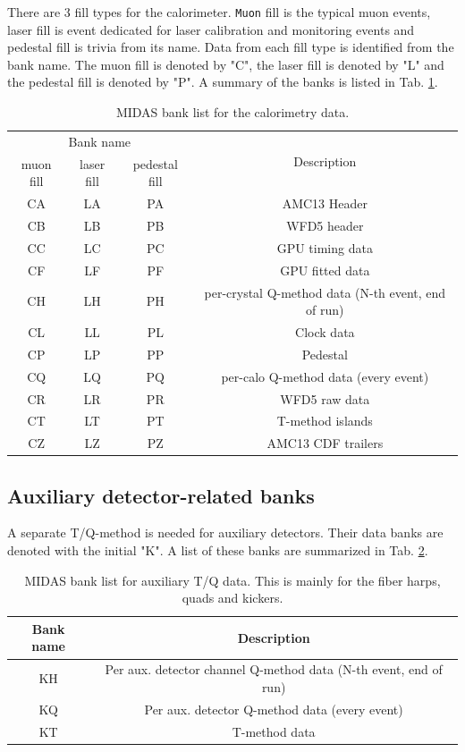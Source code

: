 {There are 3 fill types for the calorimeter. \verb+Muon+ fill is the typical muon events, laser fill is event dedicated for laser calibration and monitoring events and pedestal fill is trivia from its name. Data from each fill type is identified from the bank name. The muon fill is denoted by "C", the laser fill is denoted by "L" and the pedestal fill is denoted by "P". A summary of the banks is listed in Tab. \ref{tab:calotable}.

\begin{table}[htbp]
\centering
\caption{MIDAS bank list for the calorimetry data.}
\begin{tabular}{|c|c|c|c|}
\hline 
\multicolumn{3}{|c|}{Bank name}  & \multirow{2}{*}{Description} \\ \cline{1-3}
muon fill& laser fill & pedestal fill & \\
\hline
CA & LA & PA & AMC13 Header \\ 
\hline 
CB & LB & PB & WFD5 header \\ 
\hline 
CC & LC & PC & GPU timing data \\ 
\hline 
CF & LF & PF & GPU fitted data \\ 
\hline 
CH & LH & PH & per-crystal Q-method data (N-th event, end of run) \\ 
\hline 
CL & LL & PL & Clock data \\ 
\hline 
CP & LP & PP & Pedestal\\ 
\hline 
CQ & LQ & PQ & per-calo Q-method data (every event) \\ 
\hline 
CR & LR & PR & WFD5 raw data \\ 
\hline 
CT & LT & PT & T-method islands \\ 
\hline 
CZ & LZ & PZ & AMC13 CDF trailers \\ 
\hline 
\end{tabular} 
\label{tab:calotable}
\end{table}

\subsection{Auxiliary detector-related banks}

A separate T/Q-method is needed for auxiliary detectors. Their data banks are denoted with the initial "K".
A list of these banks are summarized in Tab. \ref{tab:auxtable}.

\begin{table}[htbp]
\centering
\caption{MIDAS bank list for auxiliary T/Q data. This is mainly for the fiber harps, quads and kickers.}
\begin{tabular}{|c|c|}
\hline 
Bank name  & Description \\
\hline
KH &  Per aux. detector channel Q-method data (N-th event, end of run)\\
\hline
KQ &  Per aux. detector Q-method data (every event)\\
\hline
KT & T-method data \\
\hline
\end{tabular} 
\label{tab:auxtable}
\end{table}

}
